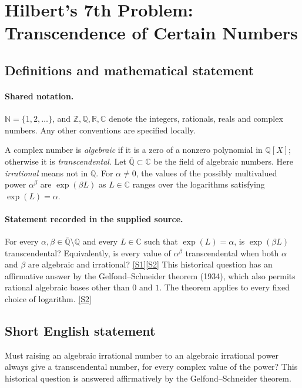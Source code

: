 \documentclass[11pt]{article}
\newcommand{\sref}[2]{\hyperlink{source:#1:#2}{[S#2]}}
\begin{document}
\section{Hilbert's 7th Problem: Transcendence of Certain Numbers}\label{statement}

\subsection{Definitions and mathematical statement}

\paragraph{Shared notation.}$\mathbb N=\{1,2,\ldots\}$, and $\mathbb Z,\mathbb Q,\mathbb R,\mathbb C$ denote the integers, rationals, reals and complex numbers. Any other conventions are specified locally.


A complex number is \emph{algebraic} if it is a zero of a nonzero polynomial in $\mathbb Q[X]$; otherwise it is \emph{transcendental}. Let $\overline{\mathbb Q}\subset\mathbb C$ be the field of algebraic numbers. Here \emph{irrational} means not in $\mathbb Q$. For $\alpha\ne0$, the values of the possibly multivalued power $\alpha^\beta$ are $\exp(\beta L)$ as $L\in\mathbb C$ ranges over the logarithms satisfying $\exp(L)=\alpha$.
\paragraph{Statement recorded in the supplied source.}
For every $\alpha,\beta\in\overline{\mathbb Q}\setminus\mathbb Q$ and every $L\in\mathbb C$ such that $\exp(L)=\alpha$, is $\exp(\beta L)$ transcendental? Equivalently, is every value of $\alpha^\beta$ transcendental when both $\alpha$ and $\beta$ are algebraic and irrational? \sref{statement}{1}\sref{statement}{2}
This historical question has an affirmative answer by the Gelfond--Schneider theorem (1934), which also permits rational algebraic bases other than $0$ and $1$. The theorem applies to every fixed choice of logarithm. \sref{statement}{2}
\subsection{Short English statement}
Must raising an algebraic irrational number to an algebraic irrational power always give a transcendental number, for every complex value of the power? This historical question is answered affirmatively by the Gelfond--Schneider theorem.
\end{document}
